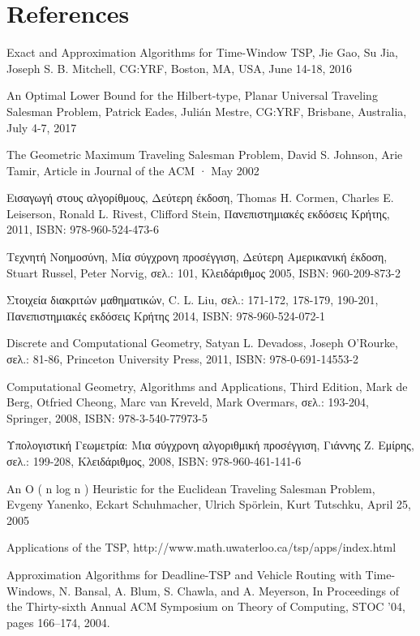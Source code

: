 \documentclass[oneside,12pt]{book}
\theoremstyle{definition}
\begin{document}
\chapter{References}
\begin{thebibliography}{depth}
	Exact and Approximation Algorithms for Time-Window TSP, 
	Jie Gao, Su Jia, Joseph S. B. Mitchell,
	CG:YRF, Boston, MA, USA, June 14-18, 2016
	
	An Optimal Lower Bound for the Hilbert-type, Planar Universal Traveling Salesman Problem, 
	Patrick Eades, Julián Mestre,
	CG:YRF, Brisbane, Australia, July 4-7, 2017
	
	The Geometric Maximum Traveling Salesman Problem, 
	David S. Johnson, Arie Tamir,
	Article in Journal of the ACM · May 2002
	
	Εισαγωγή στους αλγορίθμους, Δεύτερη έκδοση, 
	Thomas H. Cormen, Charles E. Leiserson, Ronald L. Rivest, Clifford Stein,
	Πανεπιστημιακές εκδόσεις Κρήτης, 2011,
	ISBN: 978-960-524-473-6
	
	Τεχνητή Νοημοσύνη, Μία σύγχρονη προσέγγιση, Δεύτερη Αμερικανική έκδοση, 
	Stuart Russel, Peter Norvig,
	σελ.: 101,
	Κλειδάριθμος 2005,
	ISBN: 960-209-873-2
	
	Στοιχεία διακριτών μαθηματικών, 
	C. L. Liu,
	σελ.: 171-172, 178-179, 190-201,
	Πανεπιστημιακές εκδόσεις Κρήτης 2014, 
	ISBN: 978-960-524-072-1	
	
	Discrete and Computational Geometry, 
	Satyan L. Devadoss, Joseph O'Rourke,
	σελ.: 81-86,
	Princeton University Press, 2011, 
	ISBN: 978-0-691-14553-2
	
	Computational Geometry,	Algorithms and Applications, Third Edition, 
	Mark de Berg, Otfried Cheong, Marc van Kreveld, Mark Overmars,
	σελ.: 193-204,
	Springer, 2008, 
	ISBN: 978-3-540-77973-5
	
	Υπολογιστική Γεωμετρία: Μια σύγχρονη αλγοριθμική προσέγγιση, 
	Γιάννης Ζ. Εμίρης,
	σελ.: 199-208,
	Κλειδάριθμος, 2008, 
	ISBN: 978-960-461-141-6 
	
	An O ( n log n ) Heuristic for the Euclidean Traveling Salesman Problem, 
	Evgeny Yanenko, Eckart
	Schuhmacher, Ulrich Spörlein, Kurt Tutschku,
	April 25, 2005
	
	Applications of the TSP,
	http://www.math.uwaterloo.ca/tsp/apps/index.html
	
	Approximation Algorithms for Deadline-TSP and Vehicle Routing with Time-Windows,
	N. Bansal, A. Blum, S. Chawla, and A. Meyerson,
	In Proceedings of the Thirty-sixth Annual ACM Symposium on Theory of Computing,
	STOC ’04, pages 166–174, 2004.
	
\end{thebibliography}
\end{document}
